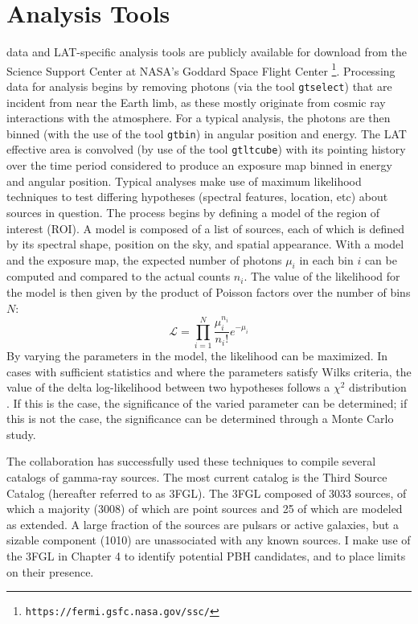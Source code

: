 \section{Analysis Tools}\label{sec:analysisTools}

\FermiLAT data and LAT-specific analysis tools are publicly available for download from the \Fermi Science Support Center at NASA's Goddard Space Flight Center \footnote{{\tt https://fermi.gsfc.nasa.gov/ssc/}}. 
Processing \FermiLAT data for analysis begins by removing photons (via the tool {\tt gtselect}) that are incident from near the Earth limb, as these mostly originate from cosmic ray interactions with the atmosphere. For a typical analysis, the photons are then binned (with the use of the tool {\tt gtbin}) in angular position and energy. The LAT effective area is convolved (by use of the tool {\tt gtltcube}) with its pointing history over the time period considered to produce an exposure map binned in energy and angular position. 
Typical \FermiLAT analyses make use of maximum likelihood techniques to test differing hypotheses (spectral features, location, etc) about sources in question. The process begins by defining a model of the region of interest (ROI). A model is composed of a list of sources, each of which is defined by its spectral shape, position on the sky, and spatial appearance. With a model and the exposure map, the expected number of photons $\mu_i$ in each bin $i$ can be computed and compared to the actual counts $n_i$. The value of the likelihood for the model is then given by the product of Poisson factors over the number of bins $N$:
\begin{equation}
\mathcal{L} = \prod_{i=1}^{N} \frac{\mu_i^{n_i}}{n_i!}e^{-\mu_i}
\end{equation}
By varying the parameters in the model, the likelihood can be maximized. In cases with sufficient statistics and where the parameters satisfy Wilks criteria, the value of the delta log-likelihood between two hypotheses follows a $\chi^2$ distribution \cite{wilks_1938}. If this is the case, the significance of the varied parameter can be determined; if this is not the case, the significance can be determined through a Monte Carlo study.

The \FermiLAT collaboration has successfully used these techniques to compile several catalogs of gamma-ray sources. The most current catalog is the Third \Fermi Source Catalog \cite{collaboration_fermi_2015} (hereafter referred to as 3FGL). The 3FGL composed of 3033 sources, of which a majority (3008) of which are point sources and 25 of which are modeled as extended. A large fraction of the sources are pulsars or active galaxies, but a sizable component (1010) are unassociated with any known sources. I make use of the 3FGL in Chapter 4 to identify potential PBH candidates, and to place limits on their presence.